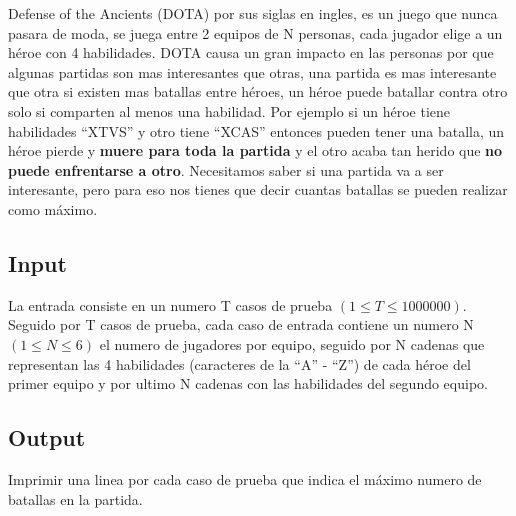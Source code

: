 
Defense of the Ancients (DOTA) por sus siglas en ingles, es un juego que nunca pasara de moda, se juega entre 2 equipos de N personas, cada jugador elige a un héroe con 4 habilidades. 
DOTA causa un gran impacto en las personas por que algunas partidas son mas interesantes que otras, una partida es mas interesante que otra si existen mas batallas entre héroes, un héroe puede batallar contra otro solo si comparten al menos una habilidad. 
Por ejemplo si un héroe tiene habilidades “XTVS” y otro tiene “XCAS” entonces pueden tener una batalla, un héroe pierde y \textbf{muere para toda la partida} y el otro acaba tan herido que \textbf{no puede enfrentarse a otro}. 
Necesitamos saber si una partida va a ser interesante, pero para eso nos tienes que decir cuantas batallas se pueden realizar como máximo.

\subsection*{Input}

La entrada consiste en un numero T casos de prueba $(1 \leq T \leq 1000000)$. Seguido por T casos de prueba, cada caso de entrada contiene un numero N $(1 \leq N \leq 6)$ el numero de jugadores por equipo, seguido por N cadenas que representan las 4 habilidades (caracteres de la “A” - “Z”) de cada héroe del primer equipo y por ultimo N cadenas con las habilidades del segundo equipo. 

\subsection*{Output}

Imprimir una linea por cada caso de prueba que indica el máximo numero de batallas en la partida.

\datos
